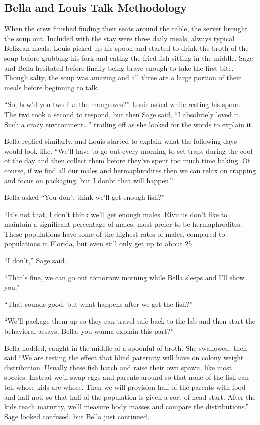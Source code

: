 \documentclass[12pt, fleqn, AofM.tex]{subfiles}
\begin{document}
\subsection{Bella and Louis Talk Methodology}
When the crew finished finding their seats around the table, the server brought the soup out. Included with the stay were three daily meals, always typical Belizean meals. Louis picked up his spoon and started to drink the broth of the soup before grabbing his fork and eating the fried fish sitting in the middle. Sage and Bella hesitated before finally being brave enough to take the first bite. Though salty, the soup was amazing and all three ate a large portion of their meals before beginning to talk.

“So, how'd you two like the mangroves?” Louis asked while resting his spoon. The two took a second to respond, but then Sage said, “I absolutely loved it. Such a crazy environment…” trailing off as she looked for the words to explain it.

Bella replied similarly, and Louis started to explain what the following days would look like. “We'll have to go out every morning to set traps during the cool of the day and then collect them before they've spent too much time baking. Of course, if we find all our males and hermaphrodites then we can relax on trapping and focus on packaging, but I doubt that will happen.”

Bella asked “You don't think we'll get enough fish?” 

“It's not that, I don't think we'll get enough males. Rivulus don't like to maintain a significant percentage of males, most prefer to be hermaphrodites. These populations have some of the highest rates of males, compared to populations in Florida, but even still only get up to about 25%

“I don't,” Sage said.

“That's fine, we can go out tomorrow morning while Bella sleeps and I'll show you.”

“That sounds good, but what happens after we get the fish?”

“We'll package them up so they can travel safe back to the lab and then start the behavioral assays. Bella, you wanna explain this part?”

Bella nodded, caught in the middle of a spoonful of broth. She swallowed, then said “We are testing the effect that blind paternity will have on colony weight distribution. Usually these fish hatch and raise their own spawn, like most species. Instead we'll swap eggs and parents around so that none of the fish can tell whose kids are whose. Then we will provision half of the parents with food and half not, so that half of the population is given a sort of head start. After the kids reach maturity, we'll measure body masses and compare the distributions.” Sage looked confused, but Bella just continued,
\end{document}
